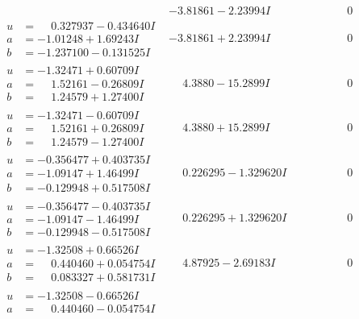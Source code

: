 \documentclass[1p]{elsarticle_modified}
\theoremstyle{definition}
\begin{document}
$$\begin{array}{c|c|c}
 & -3.81861 - 2.23994 I & \phantom{-0.000000 } 0 \\ \hline\begin{aligned}
u &= \phantom{-}0.327937 - 0.434640 I \\
a &= -1.01248 + 1.69243 I \\
b &= -1.237100 - 0.131525 I\end{aligned}
 & -3.81861 + 2.23994 I & \phantom{-0.000000 } 0 \\ \hline\begin{aligned}
u &= -1.32471 + 0.60709 I \\
a &= \phantom{-}1.52161 - 0.26809 I \\
b &= \phantom{-}1.24579 + 1.27400 I\end{aligned}
 & \phantom{-}4.3880 - 15.2899 I & \phantom{-0.000000 } 0 \\ \hline\begin{aligned}
u &= -1.32471 - 0.60709 I \\
a &= \phantom{-}1.52161 + 0.26809 I \\
b &= \phantom{-}1.24579 - 1.27400 I\end{aligned}
 & \phantom{-}4.3880 + 15.2899 I & \phantom{-0.000000 } 0 \\ \hline\begin{aligned}
u &= -0.356477 + 0.403735 I \\
a &= -1.09147 + 1.46499 I \\
b &= -0.129948 + 0.517508 I\end{aligned}
 & \phantom{-}0.226295 - 1.329620 I & \phantom{-0.000000 } 0 \\ \hline\begin{aligned}
u &= -0.356477 - 0.403735 I \\
a &= -1.09147 - 1.46499 I \\
b &= -0.129948 - 0.517508 I\end{aligned}
 & \phantom{-}0.226295 + 1.329620 I & \phantom{-0.000000 } 0 \\ \hline\begin{aligned}
u &= -1.32508 + 0.66526 I \\
a &= \phantom{-}0.440460 + 0.054754 I \\
b &= \phantom{-}0.083327 + 0.581731 I\end{aligned}
 & \phantom{-}4.87925 - 2.69183 I & \phantom{-0.000000 } 0 \\ \hline\begin{aligned}
u &= -1.32508 - 0.66526 I \\
a &= \phantom{-}0.440460 - 0.054754 I \\

\end{aligned}
\end{array}$$
\end{document}
